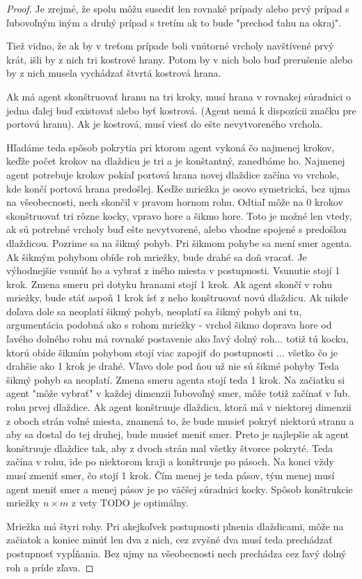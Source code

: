 \begin{proof}
Je zrejmé, že spolu môžu susediť len rovnaké prípady alebo prvý prípad s
ľubovoľným iným a druhý prípad s tretím ak to bude "prechod ťahu na okraj".

Tiež vidno, že ak by v treťom prípade boli vnútorné vrcholy navštívené prvý
krát, išli by z nich tri kostrové hrany. Potom by v nich bolo buď prerušenie
alebo by z nich musela vychádzať štvrtá kostrová hrana.

Ak má agent skonštruovať hranu na tri kroky, musí hrana v rovnakej súradnici
o jedna ďalej buď existovať alebo byť kostrová. (Agent nemá k dispozícii
značku pre portovú hranu). Ak je kostrová, musí viesť do ešte nevytvoreného
vrchola.



Hľadáme teda spôsob pokrytia pri ktorom agent vykoná čo najmenej krokov,
keďže počet krokov na dlaždicu je tri a je konštantný, zanedbáme ho.
Najmenej agent potrebuje krokov pokiaľ portová hrana novej dlaždice začína
vo vrchole, kde končí portová hrana predošlej.
Keďže mriežka je osovo symetrická, bez ujma na všeobecnosti, nech skončil v
pravom hornom rohu. Odtiaľ môže na 0 krokov skonštruovať tri rôzne kocky, 
vpravo hore a šikmo hore. Toto je možné len vtedy, ak sú potrebné vrcholy
buď ešte nevytvorené, alebo vhodne spojené s predošlou dlaždicou.
Pozrime sa na šikmý pohyb. 
Pri šikmom pohybe sa mení smer agenta. Ak šikmým pohybom obíde roh mriežky,
bude drahé sa doň vracať. Je výhodnejšie vsunúť ho a vybrať z iného miesta v
postupnosti. Vsunutie stojí 1 krok.
Zmena smeru pri dotyku hranami stojí 1 krok. Ak agent skončí v rohu mriežky,
bude stáť aspoň 1 krok ísť z neho konštruovať novú dlaždicu. Ak nikde doľava
dole sa neoplatí šikmý pohyb, neoplatí sa šikmý pohyb ani tu, argumentácia
podobná ako s rohom mriežky - vrchol šikmo doprava hore od ľavého dolného
rohu má rovnaké postavenie ako ľavý dolný roh... totiž tú kocku, ktorú obíde šikmím pohybom
stojí viac zapojiť do postupnosti ... všetko čo je drahšie ako 1 krok je
drahé. Vľavo dole pod ňou už nie sú šikmé pohyby
Teda šikmý pohyb sa neoplatí. Zmena smeru agenta stojí teda 1 krok. Na
začiatku si agent "môže vybrať" v každej dimenzii ľubovoľný smer, môže totiž
začínať v ľub. rohu prvej dlaždice.
Ak agent konštruuje dlaždicu, ktorá má v niektorej dimenzii z oboch strán
voľné miesta, znamená to, že bude musieť pokryť niektorú stranu a aby sa
dostal do tej druhej, bude musieť meniť smer. Preto je najlepšie ak agent
konštruuje dlaždice tak, aby z dvoch strán mal všetky štvorce pokryté. Teda
začína v rohu, ide po niektorom kraji a konštruuje po pásoch. Na konci vždy
musí zmeniť smer, čo stojí 1 krok. Čím menej je teda pásov, tým	menej musí
agent meniť smer a menej pásov je po väčšej súradnici kocky.
Spôsob konštrukcie mriežky $n \times m$ z vety TODO je optimálny.





Mriežka má štyri rohy. Pri akejkoľvek postupnosti plnenia dlaždicami, môže
na začiatok a koniec minúť len dva z nich, cez zvyšné dva musí teda
prechádzať postupnosť vypĺňania. Bez ujmy na všeobecnosti nech prechádza cez
ľavý dolný roh a príde zľava.


\fi
\end{proof}

